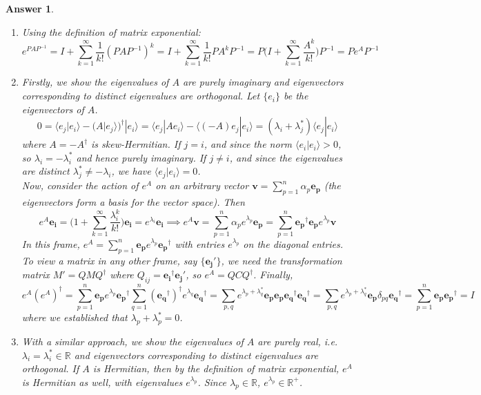 \documentclass[a4paper]{article}
\newtheorem{ans}{Answer}[section]
\theoremstyle{new}
\begin{document}
\begin{ans}\leavevmode
\begin{enumerate}[label=(\alph*)]
\item Using the definition of matrix exponential:
$$e^{PAP^{-1}}=I+\sum_{k=1}^\infty\frac{1}{k!}(PAP^{-1})^k=I+\sum_{k=1}^\infty\frac{1}{k!}PA^kP^{-1}=P\bigg(I+\sum_{k=1}^\infty\frac{A^k}{k!}\bigg)P^{-1}=Pe^AP^{-1}$$
\item Firstly, we show the eigenvalues of $A$ are purely imaginary and eigenvectors corresponding to distinct eigenvalues are orthogonal. Let $\{e_i\}$ be the eigenvectors of $A$.
$$0=\langle e_j|e_i\rangle-(A|e_j\rangle)^\dag|e_i\rangle=\langle e_j|Ae_i\rangle-\langle(-A)e_j|e_i\rangle=(\lambda_i+\lambda_j^*)\langle e_j|e_i\rangle$$
where $A=-A^\dag$ is skew-Hermitian. If $j=i$, and since the norm $\langle e_i|e_i\rangle> 0$, so  $\lambda_i=-\lambda_i^*$ and hence purely imaginary. If $j\neq i$, and since the eigenvalues are distinct $\lambda_j^*\neq-\lambda_i$, we have $\langle e_j|e_i\rangle=0$.\\[5pt]
Now, consider the action of $e^A$ on an arbitrary vector $\mathbf{v}=\sum_{p=1}^n\alpha_p\mathbf{e_p}$ (the eigenvectors form a basis for the vector space). Then
$$e^A\mathbf{e_i}=\bigg(1+\sum_{k=1}^\infty\frac{\lambda_i^k}{k!}\bigg)\mathbf{e_i}=e^{\lambda_i}\mathbf{e_i}\implies e^A\mathbf{v}=\sum_{p=1}^n\alpha_pe^{\lambda_p}\mathbf{e_p}=\sum_{p=1}^n\mathbf{e_p}^\dag\mathbf{e_p}e^{\lambda_p}\mathbf{v}$$
In this frame, $e^A=\sum_{p=1}^n\mathbf{e_p}e^{\lambda_p}\mathbf{e_p}^\dag$ with entries $e^{\lambda_p}$ on the diagonal entries. To view a matrix in any other frame, say $\{\mathbf{e_j'}\}$, we need the transformation matrix $M'=QMQ^\dag$ where $Q_{ij}=\mathbf{e_i}^\dag\mathbf{e_j'}$, so $e^A=QCQ^\dag$. Finally,
$$e^A(e^A)^\dag=\sum_{p=1}^n\mathbf{e_p}e^{\lambda_p}\mathbf{e_p}^\dag\sum_{q=1}^n(\mathbf{e_q}^\dag)^\dag e^{\lambda_q}\mathbf{e_q}^\dag=\sum_{p,q}e^{\lambda_p+\lambda_q^*}\mathbf{e_p}\mathbf{e_p}\mathbf{e_q}^\dag\mathbf{e_q}^\dag=\sum_{p,q}e^{\lambda_p+\lambda_q^*}\mathbf{e_p}\delta_{pq}\mathbf{e_q}^\dag=\sum_{p=1}^n\mathbf{e_p}\mathbf{e_p}^\dag=I$$
where we established that $\lambda_p+\lambda_p^*=0$.
\item With a similar approach, we show the eigenvalues of $A$ are purely real, i.e. $\lambda_i=\lambda_i^*\in\mathbb{R}$ and eigenvectors corresponding to distinct eigenvalues are orthogonal. If $A$ is Hermitian, then by the definition of matrix exponential, $e^A$ is Hermitian as well, with eigenvalues $e^{\lambda_p}$. Since $\lambda_p\in\mathbb{R}$, $e^{\lambda_p}\in\mathbb{R}^+$.
\end{enumerate}
\end{ans}
\end{document}
